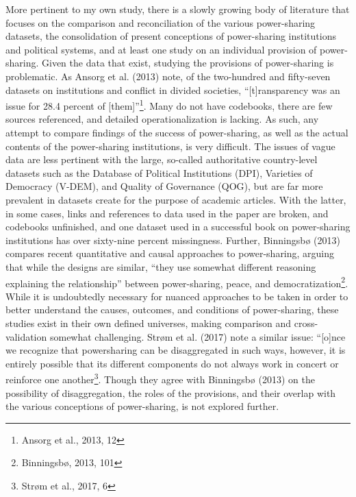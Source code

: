 \documentclass[12pt]{article}
\begin{document}
More pertinent to my own study, there is a slowly growing body of literature that focuses on the comparison and reconciliation of the various power-sharing datasets, the consolidation of present conceptions of power-sharing institutions and political systems, and at least one study on an individual provision of power-sharing. Given the data that exist, studying the provisions of power-sharing is problematic. As Ansorg et al. (2013) note, of the two-hundred and fifty-seven datasets on institutions and conflict in divided societies, “[t]ransparency was an issue for 28.4 percent of [them]”\footnote{Ansorg et al., 2013, 12}. Many do not have codebooks, there are few sources referenced, and detailed operationalization is lacking. As such, any attempt to compare findings of the success of power-sharing, as well as the actual contents of the power-sharing institutions, is very difficult. The issues of vague data are less pertinent with the large, so-called authoritative country-level datasets such as the Database of Political Institutions (DPI), Varieties of Democracy (V-DEM), and Quality of Governance (QOG), but are far more prevalent in datasets create for the purpose of academic articles. With the latter, in some cases, links and references to data used in the paper are broken, and codebooks unfinished, and one dataset used in a successful book on power-sharing institutions has over sixty-nine percent missingness. Further, Binningsbø (2013) compares recent quantitative and causal approaches to power-sharing, arguing that while the designs are similar, “they use somewhat different reasoning explaining the relationship” between power-sharing, peace, and democratization\footnote{Binningsbø, 2013, 101}. While it is undoubtedly necessary for nuanced approaches to be taken in order to better understand the causes, outcomes, and conditions of power-sharing, these studies exist in their own defined universes, making comparison and cross-validation somewhat challenging. Strøm et al. (2017) note a similar issue: “[o]nce we recognize that powersharing can be disaggregated in such ways, however, it is entirely possible that its different components do not always work in concert or reinforce one another\footnote{Strøm et al., 2017, 6}. Though they agree with Binningsbø (2013) on the possibility of disaggregation, the roles of the provisions, and their overlap with the various conceptions of power-sharing, is not explored further.  
\end{document}
